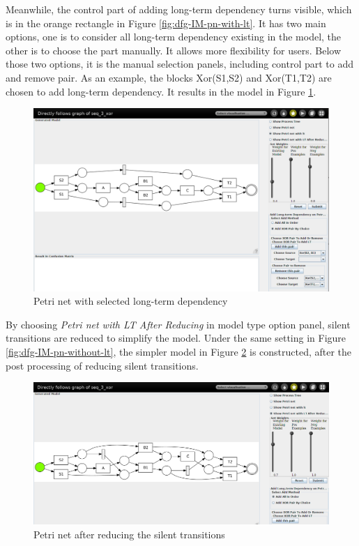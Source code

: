 Meanwhile, the control part of adding long-term dependency turns visible, which is in the orange rectangle in Figure \ref{fig:dfg-IM-pn-with-lt}.  It has two main options, one is to consider all long-term dependency existing in the model, the other is to choose the part manually. It allows more flexibility for users. Below those two options, it is the manual selection panels, including control part to add and remove pair. As an example, the blocks Xor(S1,S2) and Xor(T1,T2) are chosen to add long-term dependency. It results in the model in Figure \ref{fig:dfg-IM-pn-with-lt-m}. 
\begin{figure}
	\centering
	\includegraphics[width=\textwidth]{figures/implementation/dfg-IM-pn-with-lt-manual.png}
	\caption{Petri net with selected long-term dependency}
	\label{fig:dfg-IM-pn-with-lt-m}
\end{figure}

By choosing \emph{Petri net with LT After Reducing} in model type option panel, silent transitions are reduced to simplify the model.
Under the same setting in Figure \ref{fig:dfg-IM-pn-without-lt}, the simpler model in Figure \ref{fig:dfg-IM-pn-with-lt-r} is constructed, after the post processing of reducing silent transitions.
\begin{figure}
	\centering
	\includegraphics[width=\textwidth]{figures/implementation/dfg-IM-pn-with-lt-reduced.png}
	\caption{Petri net after reducing the silent transitions}
	\label{fig:dfg-IM-pn-with-lt-r}
\end{figure}

